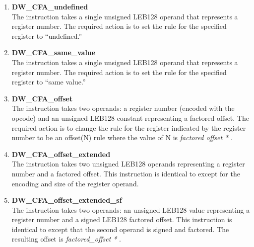 \begin{enumerate}[1. ]

\item \textbf{DW\_CFA\_undefined} \\
The  instruction takes a single unsigned
LEB128 operand that represents a register number. The required
action is to set the rule for the specified register to
``undefined.''

\item \textbf{DW\_CFA\_same\_value} \\
The  instruction takes a single unsigned
LEB128 operand that represents a register number. The required
action is to set the rule for the specified register to
``same value.''

\item \textbf{DW\_CFA\_offset} \\
The  instruction takes two operands: a register
number (encoded with the opcode) and an unsigned LEB128
constant representing a factored offset. The required action
is to change the rule for the register indicated by the
register number to be an offset(N) rule where the value of
N is 
\textit{factored offset * }.

\item \textbf{DW\_CFA\_offset\_extended} \\
The  
instruction takes two unsigned LEB128 
operands representing a register number and a factored
offset. This instruction is identical to
except for the encoding and size of the register operand.

\item \textbf{ DW\_CFA\_offset\_extended\_sf} \\
The  
instruction takes two operands:
an unsigned LEB128 
value representing a register number and a
signed LEB128 factored offset. This instruction is identical
to  
except that the second operand is
signed and factored. The resulting offset is 
\textit{factored\_offset * }.


\end{enumerate}
